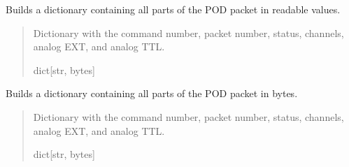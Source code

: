\documentclass[letterpaper,10pt,english]{sphinxmanual}
\begin{document}
\begin{fulllineitems}

\begin{fulllineitems}
\label{\detokenize{PodApi.Packets:PodApi.Packets.Binary5.PacketBinary5.TranslateAll}}
\pysigstartsignatures
{}
\pysigstopsignatures
\sphinxAtStartPar
Builds a dictionary containing all parts of the POD packet in readable values.
\begin{quote}\begin{description}
\sphinxAtStartPar
Dictionary with the command number, packet number, status,                 channels, analog EXT, and analog TTL.

\sphinxAtStartPar
dict{[}str, bytes{]}

\end{description}\end{quote}

\end{fulllineitems}


\begin{fulllineitems}
\label{\detokenize{PodApi.Packets:PodApi.Packets.Binary5.PacketBinary5.UnpackAll}}
\pysigstartsignatures
{}
\pysigstopsignatures
\sphinxAtStartPar
Builds a dictionary containing all parts of the POD packet in bytes.
\begin{quote}\begin{description}
\sphinxAtStartPar
Dictionary with the command number, packet number, status,                 channels, analog EXT, and analog TTL.

\sphinxAtStartPar
dict{[}str, bytes{]}

\end{description}\end{quote}

\end{fulllineitems}


\end{fulllineitems}
\end{document}
